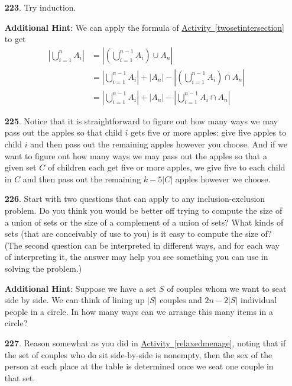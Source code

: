 \documentclass[10pt,]{book}
\theoremstyle{plain}
\theoremstyle{definition}
\theoremstyle{definition}
\theoremstyle{definition}
\numberwithin{equation}{chapter}
\newcommand{\amp}{&}
\begin{document}
\begin{itemize}[itemsep=1em]
\item[\textbf{223}.]\hypertarget{p-1199}{}%
Try induction.%

\par\smallskip
\noindent\textbf{Additional Hint}: \hypertarget{p-1200}{}%
We can apply the formula of \hyperref[twosetintersection]{Activity~\ref{twosetintersection}} to get%
\begin{align*}
\left|\bigcup_{i=1}^n A_i \right| \amp = \left|\left(\bigcup_{i=1}^{n-1} A_i\right) \cup A_n \right| \\
\amp = \left| \bigcup_{i=1}^{n-1} A_i\right| + |A_n| - \left|\left( \bigcup_{i=1}^{n-1} A_i\right) \cap A_n\right|\\
\amp = \left| \bigcup_{i=1}^{n-1} A_i\right| + |A_n| - \left|\bigcup_{i=1}^{n-1} A_i \cap A_n\right|
\end{align*}
%

\item[\textbf{225}.]\hypertarget{p-1206}{}%
Notice that it is straightforward to figure out how many ways we may pass out the apples so that child \(i\) gets five or more apples: give five apples to child \(i\) and then pass out the remaining apples however you choose. And if  we want to figure out how many ways we may pass out the apples so that a given set \(C\) of children each get five or more apples, we give five to each child in \(C\) and then pass out the remaining \(k-5|C|\) apples however we choose.%

\item[\textbf{226}.]\hypertarget{p-1209}{}%
Start with two questions that can apply to any inclusion-exclusion problem. Do you think you would be better off trying to compute the size of a union of sets or the size of a complement of a union of sets? What kinds of sets (that are conceivably of use to you) is it easy to compute the size of? (The second question can be interpreted in different ways, and for each way of interpreting it, the answer may help you see something you can use in solving the problem.)%

\par\smallskip
\noindent\textbf{Additional Hint}: \hypertarget{p-1210}{}%
Suppose we have a set \(S\) of couples whom we want to seat side by side. We can think of lining up \(|S|\) couples and \(2n - 2|S|\) individual people in a circle.  In how many ways can we arrange this many items in a circle?%

\item[\textbf{227}.]\hypertarget{p-1213}{}%
Reason somewhat as you did in \hyperref[relaxedmenage]{Activity~\ref{relaxedmenage}}, noting that if the set of couples who do sit side-by-side is nonempty, then the sex of the person at each place at the table is determined once we seat one couple in that set.%


\end{itemize}
\end{document}
